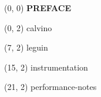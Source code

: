 \documentclass[10pt]{article}
\begin{document}
\begin{textblock}{31}(0, 0)
    \center\huge\textbf{PREFACE}
\end{textblock}

\begin{textblock}{6}(0, 2)
    {calvino}
\end{textblock}

\begin{textblock}{7}(7, 2)
    {leguin}
\end{textblock}

\begin{textblock}{5}(15, 2)
    {instrumentation}
\end{textblock}

\begin{textblock}{10}(21, 2)
    {performance-notes}
\end{textblock}
\end{document}
